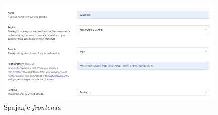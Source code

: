 \begin{packed_item}
			\begin{figure}[H]
				\includegraphics[scale=1]{slike/frontendDeploy4.png}
				\centering
				\caption{Spajanje \textit{frontenda}}
				\label{fig:frontendDeploy4}
			\end{figure}

		
		\end{packed_item}
			
			

			

			



			\eject 